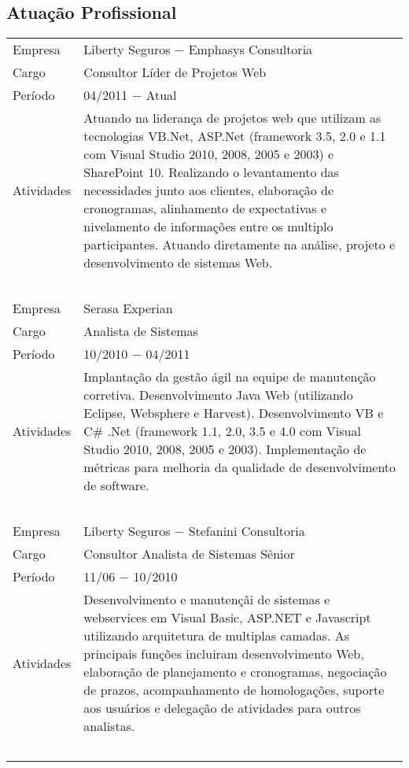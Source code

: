 \documentclass[a4paper, oneside, final]{scrartcl}
\begin{document}
\begin{center}
\section{Atuação Profissional}

\begin{tabularx}{0.97\linewidth}{p{2cm}X}

Empresa     & Liberty Seguros $-$ Emphasys Consultoria \\
Cargo       & Consultor Líder de Projetos Web \\
Período     & 04/2011 $-$ Atual \\
Atividades  & Atuando na liderança de projetos web que utilizam as tecnologias VB.Net, ASP.Net (framework 3.5, 2.0 e 1.1 com Visual Studio 2010, 2008, 2005 e 2003) e SharePoint 10. Realizando o levantamento das necessidades junto aos clientes, elaboração de cronogramas, alinhamento de expectativas e nivelamento de informações entre os multiplo participantes. Atuando diretamente na análise, projeto e desenvolvimento de sistemas Web. \\
            & \ \\

Empresa     & Serasa Experian\\
Cargo       & Analista de Sistemas\\
Período     & 10/2010 $-$ 04/2011\\
Atividades  & Implantação da gestão ágil na equipe de manutenção corretiva. Desenvolvimento Java Web (utilizando Eclipse, Websphere e Harvest). Desenvolvimento VB e C\# .Net (framework 1.1, 2.0, 3.5 e 4.0 com Visual Studio 2010, 2008, 2005 e 2003). Implementação de métricas para melhoria da qualidade de desenvolvimento de software. \\
            & \ \\

Empresa     & Liberty Seguros $-$ Stefanini Consultoria \\
Cargo       & Consultor Analista de Sistemas Sênior \\
Período     & 11/06 $-$ 10/2010 \\
Atividades  & Desenvolvimento e manutençãi de sistemas e webservices em Visual Basic, ASP.NET e Javascript utilizando arquitetura de multiplas camadas. As principais funções incluiram desenvolvimento Web, elaboração de planejamento e cronogramas, negociação de prazos, acompanhamento de homologações, suporte aos usuários e delegação de atividades para outros analistas. \\
            & \ \\


\end{tabularx}
\end{center}
\end{document}
